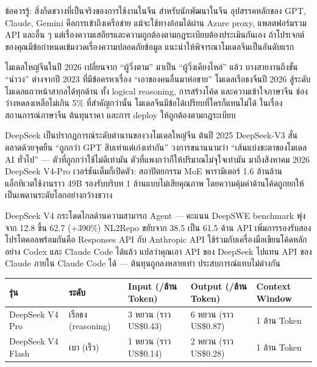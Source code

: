 \begin{tcbwarn}{ข้อควรรู้: สิ่งกีดขวางที่เป็นจริงของการใช้งานในจีน}
สำหรับนักพัฒนาในจีน อุปสรรคหลักของ GPT, Claude, Gemini คือการเข้าถึงเครือข่าย แม้จะใช้ทางอ้อมได้ผ่าน Azure proxy, แพลตฟอร์มรวม API และอื่น ๆ แต่เรื่องความเสถียรและความถูกต้องตามกฎระเบียบต้องประเมินกันเอง ถ้าโปรเจกต์ของคุณมีข้อกำหนดเข้มงวดเรื่องความปลอดภัยข้อมูล แนะนำให้พิจารณาโมเดลจีนเป็นอันดับแรก

\end{tcbwarn}


โมเดลใหญ่จีนในปี 2026 เปลี่ยนจาก “ผู้วิ่งตาม” มาเป็น “ผู้วิ่งเคียงไหล่” แล้ว บางสายงานถึงขั้น “นำวง” ต่างจากปี 2023 ที่มีข้อครหาเรื่อง “เอาของคนอื่นมาห่อขาย” โมเดลเรือธงจีนปี 2026 สู้ระดับโมเดลแถวหน้าสากลได้ทุกด้าน ทั้ง logical reasoning, การสร้างโค้ด และความเข้าใจภาษาจีน ช่องว่างหดลงเหลือไม่เกิน 5\% ที่สำคัญกว่านั้น โมเดลจีนมีข้อได้เปรียบที่ใครก็แทนไม่ได้ ในเรื่องสถานการณ์ภาษาจีน ต้นทุนราคา และการ deploy ให้ถูกต้องตามกฎระเบียบ


DeepSeek เป็นปรากฏการณ์ระดับตำนานของวงโมเดลใหญ่จีน ต้นปี 2025 DeepSeek-V3 สั่นตลาดด้วยจุดยืน “ถูกกว่า GPT สิบเท่าแต่เก่งเท่ากัน” วงการขนานนามว่า “เส้นแบ่งชะตาของโมเดล AI ทั่วไป” — ตัวที่ถูกกว่าใช้ไม่ดีเท่ามัน ตัวที่แพงกว่าก็ให้ปริมาณไม่จุใจเท่ามัน มาถึงสิงหาคม 2026 DeepSeek V4-Pro เวอร์ชันเต็มก็เปิดตัว: สถาปัตยกรรม MoE พารามิเตอร์ 1.6 ล้านล้าน แอ็กทิเวตใช้งานราว 49B รองรับบริบท 1 ล้านแบบไม่เสียคุณภาพ โดยความคุ้มค่าด้านโค้ดถูกยกให้เป็นเพดานระดับโลกอย่างกว้างขวาง

DeepSeek V4 กระโดดไกลด้านความสามารถ Agent — คะแนน DeepSWE benchmark พุ่งจาก 12.8 ขึ้น 62.7 (+390\%) NL2Repo ขยับจาก 38.5 เป็น 61.5 ด้าน API เพิ่มการรองรับสองโปรโตคอลพร้อมกันคือ Responses API กับ Anthropic API ใช้ร่วมกับเครื่องมือเขียนโค้ดหลักอย่าง Codex และ Claude Code ได้แล้ว แปลว่าคุณเอา API ของ DeepSeek ไปแทน API ของ Claude ภายใน Claude Code ได้ — ต้นทุนถูกลงหลายเท่า ประสบการณ์แทบไม่ต่างกัน

\begin{center}
\begin{tabularx}{\linewidth}{|X|X|X|X|X|}
\hline
\textbf{รุ่น} & \textbf{ระดับ} & \textbf{Input (/ล้าน Token)} & \textbf{Output (/ล้าน Token)} & \textbf{Context Window} \tabularnewline
\hline
DeepSeek V4 Pro & เรือธง (reasoning) & 3 หยวน (ราว US\$0.43) & 6 หยวน (ราว US\$0.87) & 1 ล้าน Token \tabularnewline
DeepSeek V4 Flash & เบา (เร็ว) & 1 หยวน (ราว US\$0.14) & 2 หยวน (ราว US\$0.28) & 1 ล้าน Token \tabularnewline
\hline
\end{tabularx}
\end{center}

